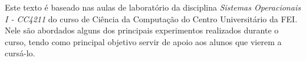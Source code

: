 \begin{resumo}

Este texto é baseado nas aulas de laboratório da disciplina \emph{Sistemas Operacionais I - CC4211} do curso de Ciência da Computação do Centro Universitário da FEI. Nele são abordados alguns dos principais experimentos realizados durante o curso, tendo como principal objetivo servir de apoio aos alunos que vierem a cursá-lo.

\end{resumo}